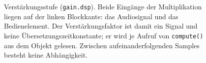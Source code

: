 \begin{figure}
\centering
{}
\caption[Faust-Blockdiagramm der Verst\"arkungsstufe]%
{Verst\"arkungsstufe (\texttt{gain.dsp}). Beide Eing\"ange der
Multiplikation liegen auf der linken Blockkante: das Audiosignal und das
Bedienelement. Der Verst\"arkungsfaktor ist damit ein Signal und keine
\"Ubersetzungszeitkonstante; er wird je Aufruf von \texttt{compute()} aus dem
Objekt gelesen. Zwischen aufeinanderfolgenden Samples besteht keine
Abh\"angigkeit.}
\label{fig:faust-gain}
\end{figure}
